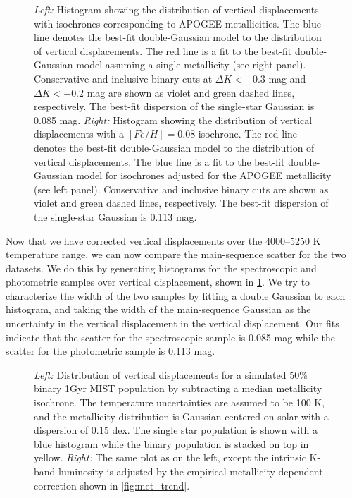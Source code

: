\documentclass[manuscript]{aastex6}
\begin{document}
\begin{figure}[htb]
    \centering
    \caption{\emph{Left:} Histogram showing the distribution of vertical 
        displacements with isochrones corresponding to APOGEE metallicities.
        The blue line denotes the best-fit double-Gaussian model to the
        distribution of vertical displacements. The red line is a fit to the
        best-fit double-Gaussian model assuming a single metallicity (see right
        panel). Conservative and inclusive binary cuts at \(\Delta K < -0.3\)
        mag and \(\Delta K < -0.2\) mag are shown as violet and green dashed 
        lines, respectively. The best-fit dispersion of the single-star 
        Gaussian is 0.085 mag. \emph{Right:} Histogram showing the 
        distribution of vertical displacements with a \([Fe/H] = 0.08\) 
        isochrone. The red line denotes the best-fit double-Gaussian model to
        the distribution of vertical displacements. The blue line is a fit to
        the best-fit double-Gaussian model for isochrones adjusted for the
        APOGEE metallicity (see left panel). Conservative and inclusive binary
        cuts are shown as violet and green dashed lines, respectively. The
        best-fit dispersion of the single-star Gaussian is 0.113 
    mag.}\label{fig:histcompare}
\end{figure}

Now that we have corrected vertical displacements over the 4000--5250 K
temperature range, we can now compare the main-sequence scatter for the two
datasets. We do this by generating histograms for the spectroscopic and
photometric samples over vertical displacement, shown in
\cref{fig:histcompare}. We try to characterize the width of the two samples by
fitting a double Gaussian to each histogram, and taking the width of the
main-sequence Gaussian as the uncertainty in the vertical displacement in the
vertical displacement. Our fits indicate that the scatter for the spectroscopic
sample is 0.085 mag while the scatter for the photometric sample is 0.113 mag.

\begin{figure}[htb]
    \centering
    \caption{\emph{Left:} Distribution of vertical displacements for a
        simulated 50\% binary 1Gyr MIST population by subtracting a median 
        metallicity isochrone. The temperature uncertainties are assumed to be 
        100 K, and the metallicity distribution is Gaussian centered on solar 
        with a dispersion of 0.15 dex. The single star population is shown 
        with a blue histogram while the binary population is stacked on top in 
    yellow. \emph{Right:} The same plot as on the left, except the intrinsic
K-band luminosity is adjusted by the empirical metallicity-dependent correction
shown in \cref{fig:met_trend}.}\label{fig:mswidth}
\end{figure}
\end{document}
